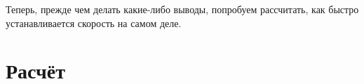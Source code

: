 \documentclass[a4paper, 12pt]{article}
\begin{document}
    Теперь, прежде чем делать какие-либо выводы, попробуем рассчитать,
    как быстро устанавливается скорость на самом деле.


    \section{Расчёт}


%
%
\end{document}
